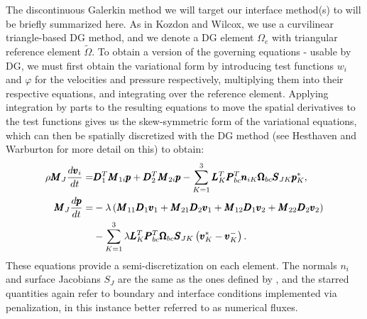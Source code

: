 The discontinuous Galerkin method we will target our interface method(s) to
will be briefly summarized here. As in Kozdon and Wilcox, we use a curvilinear
triangle-based DG method, and we denote a DG element $\Omega_e$ with triangular
reference element $\tilde{\Omega}$. To obtain a version of the governing equations
 -  usable by DG, we must first obtain the variational
form by introducing test functions $w_{i}$ and $\varphi$ for the velocities and pressure
respectively, multiplying them into their respective equations, and integrating over
the reference element. Applying integration by parts to the resulting equations to move
the spatial derivatives to the test functions gives us the skew-symmetric form of the
variational equations, which can then be spatially discretized with the DG method 
(see Hesthaven and Warburton \cite{hesthaven2007nodal} for more detail on this) to obtain:
\begin{align}
  \rho \pmb{M}_{J} \frac{d \pmb{v}_{i}}{dt} =&
  \pmb{D}_{1}^{T} \pmb{M}_{1i} \pmb{p}
  + \pmb{D}_{2}^{T} \pmb{M}_{2i} \pmb{p}
  - \sum_{K=1}^{3} \pmb{L}_{K}^{T} \pmb{P}_{bc}^{T} \pmb{n}_{iK}
  \pmb{\Omega}_{bc} \pmb{S}_{JK} \pmb{p}_{K}^{*},\\
  \notag
  \pmb{M}_{J} \frac{d\pmb{p}}{dt} =&
  -\lambda\left(
  \pmb{M}_{11} \pmb{D}_{1} \pmb{v}_{1}
    +
    \pmb{M}_{21} \pmb{D}_{2} \pmb{v}_{1}
    +
    \pmb{M}_{12} \pmb{D}_{1} \pmb{v}_{2}
    +
    \pmb{M}_{22} \pmb{D}_{2} \pmb{v}_{2}
  \right)\\
  &- \sum_{K=1}^{3}\lambda \pmb{L}_{K}^{T} \pmb{P}_{bc}^{T} \pmb{\Omega}_{bc}
  \pmb{S}_{JK} \left(\pmb{v}_{K}^* - \pmb{v}_{K}^{-}\right).
\end{align}
These equations provide a semi-discretization on each element.
The normals $n_{i}$ and surface Jacobians $S_{J}$ are the same
as the ones defined by , and the starred
quantities again refer to boundary and interface conditions implemented via penalization,
in this instance better referred to as numerical fluxes.
